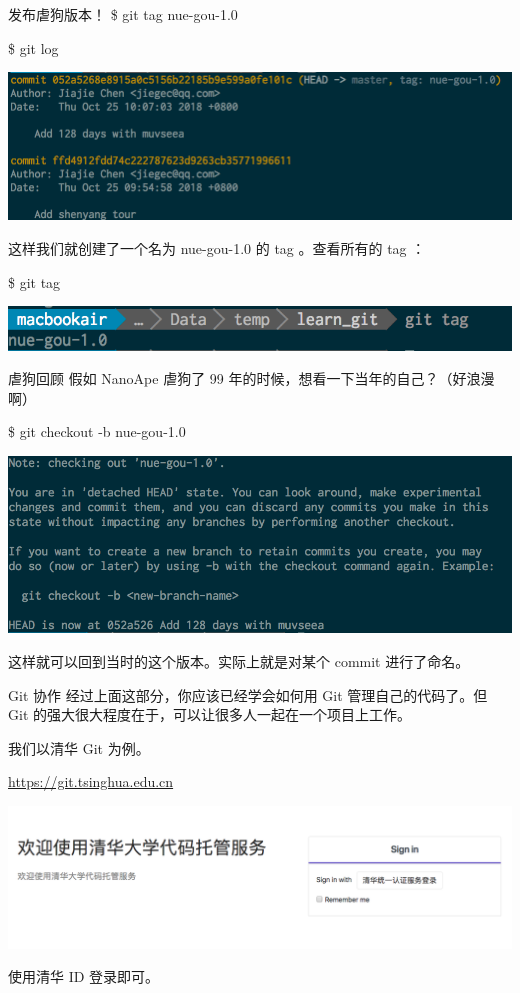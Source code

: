 \documentclass{beamer}
\begin{document}
\begin{frame}{发布虐狗版本！}
    \$ git tag nue-gou-1.0

    \$ git log

    \includegraphics[width=\linewidth]{2018-10-25-11-16-26.png}

    这样我们就创建了一个名为 nue-gou-1.0 的 tag 。查看所有的 tag ：

    \$ git tag

    \includegraphics[width=\linewidth]{2018-10-25-11-18-36.png}
\end{frame}

\begin{frame}{虐狗回顾}
    假如 NanoApe 虐狗了 99 年的时候，想看一下当年的自己？（好浪漫啊）

    \$ git checkout -b nue-gou-1.0

    \includegraphics[width=\linewidth]{2018-10-25-11-21-49.png}

    这样就可以回到当时的这个版本。实际上就是对某个 commit 进行了命名。
\end{frame}

\begin{frame}{Git 协作}
    经过上面这部分，你应该已经学会如何用 Git 管理自己的代码了。但 Git 的强大很大程度在于，可以让很多人一起在一个项目上工作。

    我们以清华 Git 为例。

    \url{https://git.tsinghua.edu.cn}

    \includegraphics[width=\linewidth]{2018-10-25-11-31-40.png}

    使用清华 ID 登录即可。
\end{frame}
\end{document}
